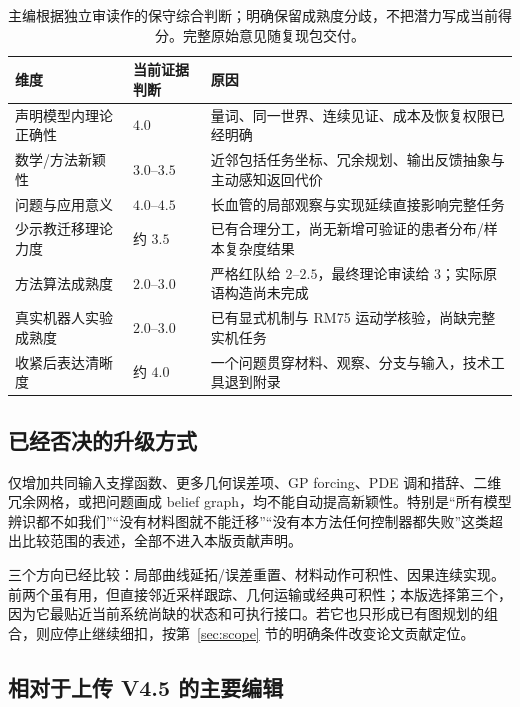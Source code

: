 \documentclass[11pt,a4paper]{article}
\theoremstyle{cn}
\begin{document}
\begin{table}[htbp]
\centering\small
\begin{tabularx}{\linewidth}{@{}p{.26\linewidth}p{.18\linewidth}X@{}}
\toprule
维度 & 当前证据判断 & 原因\\
\midrule
声明模型内理论正确性 & \(4.0\) & 量词、同一世界、连续见证、成本及恢复权限已经明确\\
数学/方法新颖性 & \(3.0\)--\(3.5\) & 近邻包括任务坐标、冗余规划、输出反馈抽象与主动感知返回代价\\
问题与应用意义 & \(4.0\)--\(4.5\) & 长血管的局部观察与实现延续直接影响完整任务\\
少示教迁移理论力度 & 约 \(3.5\) & 已有合理分工，尚无新增可验证的患者分布/样本复杂度结果\\
方法算法成熟度 & \(2.0\)--\(3.0\) & 严格红队给 \(2\)--\(2.5\)，最终理论审读给 \(3\)；实际原语构造尚未完成\\
真实机器人实验成熟度 & \(2.0\)--\(3.0\) & 已有显式机制与 RM75 运动学核验，尚缺完整实机任务\\
收紧后表达清晰度 & 约 \(4.0\) & 一个问题贯穿材料、观察、分支与输入，技术工具退到附录\\
\bottomrule
\end{tabularx}
\caption{主编根据独立审读作的保守综合判断；明确保留成熟度分歧，不把潜力写成当前得分。完整原始意见随复现包交付。}
\end{table}

\subsection{已经否决的升级方式}

仅增加共同输入支撑函数、更多几何误差项、GP forcing、PDE 调和措辞、二维冗余网格，或把问题画成 belief graph，均不能自动提高新颖性。特别是“所有模型辨识都不如我们”“没有材料图就不能迁移”“没有本方法任何控制器都失败”这类超出比较范围的表述，全部不进入本版贡献声明。

三个方向已经比较：局部曲线延拓/误差重置、材料动作可积性、因果连续实现。前两个虽有用，但直接邻近采样跟踪、几何运输或经典可积性；本版选择第三个，因为它最贴近当前系统尚缺的状态和可执行接口。若它也只形成已有图规划的组合，则应停止继续细扣，按第~\ref{sec:scope} 节的明确条件改变论文贡献定位。

\subsection{相对于上传 V4.5 的主要编辑}
\end{document}
